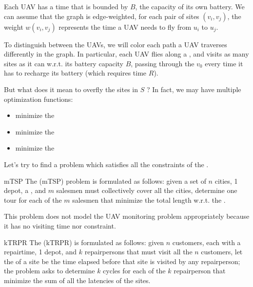 \documentclass[a4paper, 12pt]{report}
\begin{document}
    Each UAV has a  time that is bounded by $B$, the capacity of its own battery. We can assume that the graph is edge-weighted, for each pair of sites $(v_i,v_j)$, the weight $w(v_i, v_j)$ represents the time a UAV needs to fly from $u_i$ to $u_j$.

    To distinguish between the UAVs, we will color each path a UAV traverses differently in the graph. In particular, each UAV flies along a , and visits as many sites as it can w.r.t. its battery capacity $B$, passing through the  $v_0$ every time it has to recharge its battery (which requires time $R$).

    But what does it mean to overfly the sites in $S$ ? In fact, we may have multiple optimization functions:

    \begin{itemize}
        \item minimize the 
        \item minimize the 
        \item minimize the 
    \end{itemize}

    Let's try to find a problem which satisfies all the constraints of the .

    \begin{frameddefn}{mTSP}
        The  (mTSP) problem is formulated as follows: given a set of $n$ cities, 1 depot, a , and $m$ salesmen must collectively cover all the cities, determine one tour for each of the $m$ salesmen that minimize the total length w.r.t. the .
    \end{frameddefn}

    This problem does not model the UAV monitoring problem appropriately because it has no visiting time nor  constraint.

    \begin{frameddefn}{kTRPR}
        The  (kTRPR) is formulated as follows: given $n$ customers, each with a repairtime, 1 depot, and $k$ repairpersons that must visit all the $n$ customers, let the  of a site be the time elapsed before that site is visited by any repairperson; the problem asks to determine $k$ cycles for each of the $k$ repairperson that minimize the sum of all the latencies of the sites.
    \end{frameddefn}
\end{document}
